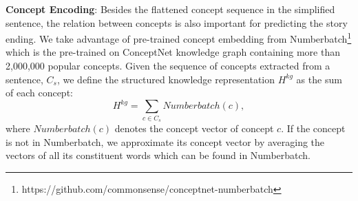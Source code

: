 






\textbf{Concept Encoding}:
Besides the flattened concept sequence in the simplified sentence, 
the relation between concepts is also important for 
predicting the story ending. 
We take advantage of pre-trained concept embedding from
Numberbatch\footnote{https://github.com/commonsense/conceptnet-numberbatch}
which is the pre-trained on ConceptNet knowledge graph 
containing more than 2,000,000 popular concepts. 
Given the sequence of concepts extracted from a sentence, $C_s$,
we define the structured knowledge representation $H^{kg}$
as the sum of each concept:
\begin{equation}
  H^{kg} = \sum_{c \in C_s}{Numberbatch(c)},
\end{equation}
\noindent
where $Numberbatch(c)$ denotes the concept vector of concept $c$.
If the concept is not in Numberbatch, we approximate its concept vector
by averaging the vectors of all its constituent words which can be found 
in Numberbatch.

